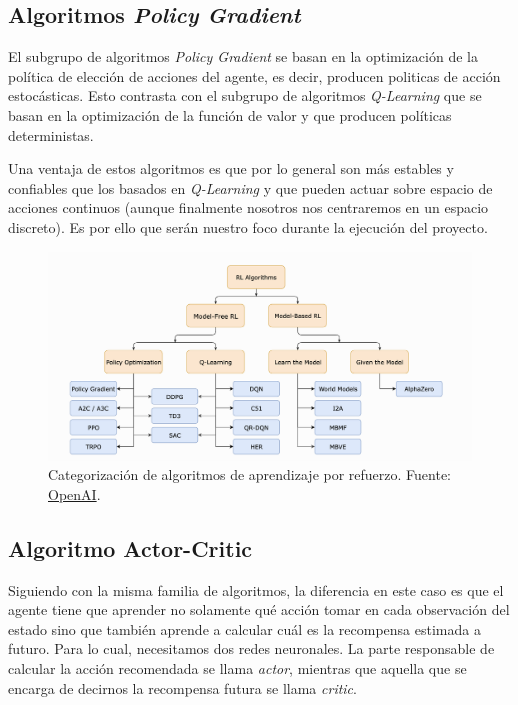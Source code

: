\subsection{Algoritmos \textit{Policy Gradient}}
\label{algoritmo-policy-gradient}

El subgrupo de algoritmos \textit{Policy Gradient} \citep{sutton1999policy} se basan en la optimización de la política de elección de acciones del agente, es decir, producen politicas de acción estocásticas. Esto contrasta con el subgrupo de algoritmos \textit{Q-Learning} \citep{mnih2013playing} que se basan en la optimización de la función de valor y que producen políticas deterministas.
\medskip

Una ventaja de estos algoritmos es que por lo general son más estables y confiables que los basados en \textit{Q-Learning} y que pueden actuar sobre espacio de acciones continuos (aunque finalmente nosotros nos centraremos en un espacio discreto). Es por ello que serán nuestro foco durante la ejecución del proyecto.
\medskip


\begin{figure}[ht!]
  \centering
  \includegraphics[width=1\textwidth]{figuras/rl_algorithms_classification.png}
  \caption[Categorización de algoritmos de aprendizaje por refuerzo.]{Categorización de algoritmos de aprendizaje por refuerzo. Fuente: \href{https://spinningup.openai.com/en/latest/spinningup/rl_intro2.html}{OpenAI}.}
  \label{fig-rl-algorithms-family}
\end{figure}

\subsection{Algoritmo Actor-Critic}
\label{algoritmo-actor-critic}

Siguiendo con la misma familia de algoritmos, la diferencia en este caso es que el agente tiene que aprender no solamente qué acción tomar en cada observación del estado sino que también aprende a calcular cuál es la recompensa estimada a futuro. Para lo cual, necesitamos dos redes neuronales. La parte responsable de calcular la acción recomendada se llama \textit{actor}, mientras que aquella que se encarga de decirnos la recompensa futura se llama \textit{critic}.
\medskip

